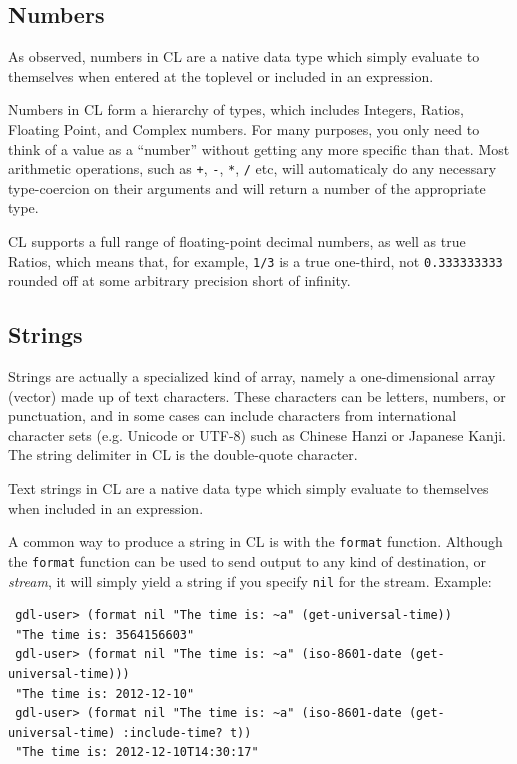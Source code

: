 \documentclass [11pt]{book}
\begin{document}
\subsection{Numbers}

\label{subsec:numbers}



As observed, numbers in CL are a native data type which
simply evaluate to themselves when entered at the toplevel or included
in an expression.



Numbers in CL form a hierarchy of types, which includes Integers,
Ratios, Floating Point, and Complex numbers. For many purposes, you
only need to think of a value as a ``number'' without getting any more
specific than that. Most arithmetic operations, such as \texttt{+}, \texttt{-}, \texttt{*}, \texttt{/} etc, will automaticaly do any necessary type-coercion on their
arguments and will return a number of the appropriate type.

CL supports a full range of floating-point decimal numbers, as well as
true Ratios, which means that, for example, \texttt{1/3} is a true one-third, not \texttt{0.333333333} rounded off at some arbitrary precision short of
	    infinity.



\subsection{Strings}

\label{subsec:strings}



Strings are actually a specialized kind of
array, namely a one-dimensional array (vector) made up of text
characters. These characters can be letters, numbers, or punctuation,
and in some cases can include characters from international character
sets (e.g. Unicode or UTF-8) such as Chinese Hanzi or Japanese
Kanji. The string delimiter in CL is the double-quote character.



Text strings in CL are a native data type which simply
evaluate to themselves when included in an expression.



A common way to produce a string in CL is with the \texttt{format} function. Although the \texttt{format} function can be used to send output to any kind of destination, or \emph{stream}, it will simply yield a string if you specify \texttt{nil} for the stream. Example: 
{\small

\begin{verbatim}
 gdl-user> (format nil "The time is: ~a" (get-universal-time))
 "The time is: 3564156603"
 gdl-user> (format nil "The time is: ~a" (iso-8601-date (get-universal-time)))
 "The time is: 2012-12-10"
 gdl-user> (format nil "The time is: ~a" (iso-8601-date (get-universal-time) :include-time? t))
 "The time is: 2012-12-10T14:30:17"
\end{verbatim}}
\end{document}
